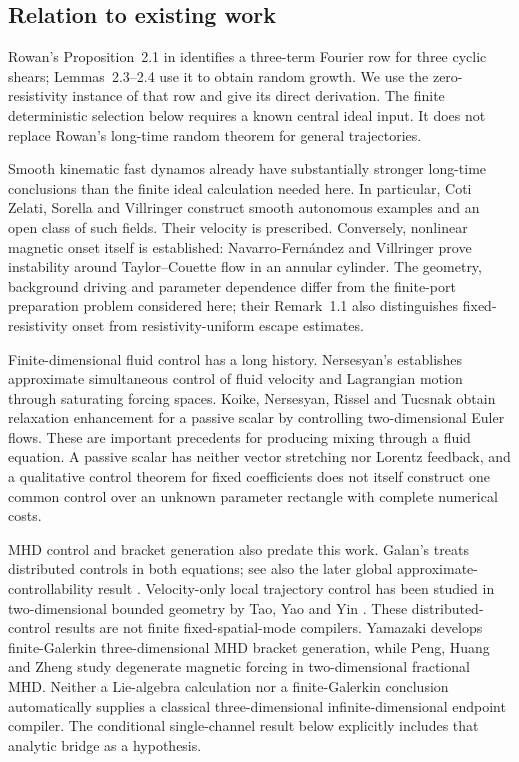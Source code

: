\documentclass[11pt,a4paper]{amsart}
\theoremstyle{definition}
\theoremstyle{remark}
\numberwithin{equation}{section}
\begin{document}
\subsection{Relation to existing work}
Rowan's Proposition~2.1 in \cite{Rowan} identifies a three-term Fourier row for three cyclic shears; Lemmas~2.3--2.4 use it to obtain random growth. We use the zero-resistivity instance of that row and give its direct derivation. The finite deterministic selection below requires a known central ideal input. It does not replace Rowan's long-time random theorem for general trajectories.

Smooth kinematic fast dynamos already have substantially stronger long-time conclusions than the finite ideal calculation needed here. In particular, Coti Zelati, Sorella and Villringer \cite[Theorems~1.1--1.2]{CZSV} construct smooth autonomous examples and an open class of such fields. Their velocity is prescribed. Conversely, nonlinear magnetic onset itself is established: Navarro-Fern\'andez and Villringer \cite[Theorem~1.1]{NFV} prove instability around Taylor--Couette flow in an annular cylinder. The geometry, background driving and parameter dependence differ from the finite-port preparation problem considered here; their Remark~1.1 also distinguishes fixed-resistivity onset from resistivity-uniform escape estimates.

Finite-dimensional fluid control has a long history. Nersesyan's \cite[Theorem~2.2]{Nersesyan} establishes approximate simultaneous control of fluid velocity and Lagrangian motion through saturating forcing spaces. Koike, Nersesyan, Rissel and Tucsnak \cite[Theorem~2.4 and Corollary~1.5]{KNRT} obtain relaxation enhancement for a passive scalar by controlling two-dimensional Euler flows. These are important precedents for producing mixing through a fluid equation. A passive scalar has neither vector stretching nor Lorentz feedback, and a qualitative control theorem for fixed coefficients does not itself construct one common control over an unknown parameter rectangle with complete numerical costs.

MHD control and bracket generation also predate this work. Galan's \cite[Theorem~2.1]{Galan2011} treats distributed controls in both equations; see also the later global approximate-controllability result \cite{Galan2013}. Velocity-only local trajectory control has been studied in two-dimensional bounded geometry by Tao, Yao and Yin \cite{TYY}. These distributed-control results are not finite fixed-spatial-mode compilers. Yamazaki \cite[Theorem~2.1 and Proposition~4.1]{Yamazaki} develops finite-Galerkin three-dimensional MHD bracket generation, while Peng, Huang and Zheng \cite[Hypothesis~1.1 and Theorem~2.1]{PHZ} study degenerate magnetic forcing in two-dimensional fractional MHD. Neither a Lie-algebra calculation nor a finite-Galerkin conclusion automatically supplies a classical three-dimensional infinite-dimensional endpoint compiler. The conditional single-channel result below explicitly includes that analytic bridge as a hypothesis.
\end{document}
